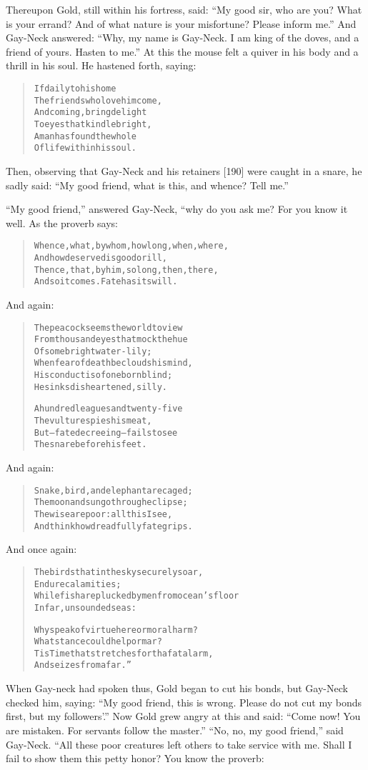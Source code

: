 \documentclass[article, twoside, 14pt]{memoir}
\renewenvironment{verbatim}{%
\begin{quote}%
\vskip -10pt%
\begin{alltt}\normalfont\large}{\end{alltt}%
\end{quote}%
\vskip -10pt
} %
\begin{document}
Thereupon Gold, still within his fortress, said:
``My good sir, who are you? What is your errand? And of what nature is your misfortune? Please inform me.''
And Gay-Neck answered:
``Why, my name is Gay-Neck. I am king of the doves, and a friend of yours. Hasten to me.''
At this the mouse felt a quiver in his body and a thrill in his
soul. He hastened forth, saying:

\begin{verbatim}
If daily to his home
The friends who love him come,
And coming, bring delight
To eyes that kindle bright,
A man has found the whole
Of life within his soul.
\end{verbatim}
Then, observing that Gay-Neck and his retainers [190] were caught
in a snare, he sadly said:
``My good friend, what is this, and whence? Tell me.''

``My good friend,'' answered Gay-Neck, “why do you ask me? For you
know it well. As the proverb says:

\begin{verbatim}
Whence, what, by whom, how long, when, where,
    And how deserved is good or ill,
Thence, that, by him, so long, then, there,
    And so it comes. Fate has its will.
\end{verbatim}
And again:

\begin{verbatim}
The peacock seems the world to view
From thousand eyes that mock the hue
    Of some bright water-lily;
When fear of death beclouds his mind,
His conduct is of one born blind;
    He sinks disheartened, silly.

A hundred leagues and twenty-five
    The vulture spies his meat,
But--fate decreeing--fails to see
    The snare before his feet.
\end{verbatim}
And again:

\begin{verbatim}
Snake, bird, and elephant are caged;
    The moon and sun go through eclipse;
The wise are poor: all this I see,
    And think how dreadfully fate grips.
\end{verbatim}
And once again:

\begin{verbatim}
The birds that in the sky securely soar,
    Endure calamities;
While fish are plucked by men from ocean's floor
    In far, unsounded seas:

Why speak of virtue here or moral harm?
What stance could help or mar?
Tis Time that stretches forth a fatal arm,
And seizes from afar.”
\end{verbatim}
When Gay-neck had spoken thus, Gold began to cut his bonds, but
Gay-Neck checked him, saying:
``My good friend, this is wrong. Please do not cut my bonds first, but my followers'.''
Now Gold grew angry at this and said:
``Come now! You are mistaken. For servants follow the master.''
``No, no, my good friend,'' said Gay-Neck. “All these poor
creatures left others to take service with me. Shall I fail to show
them this petty honor? You know the proverb:
\end{document}
